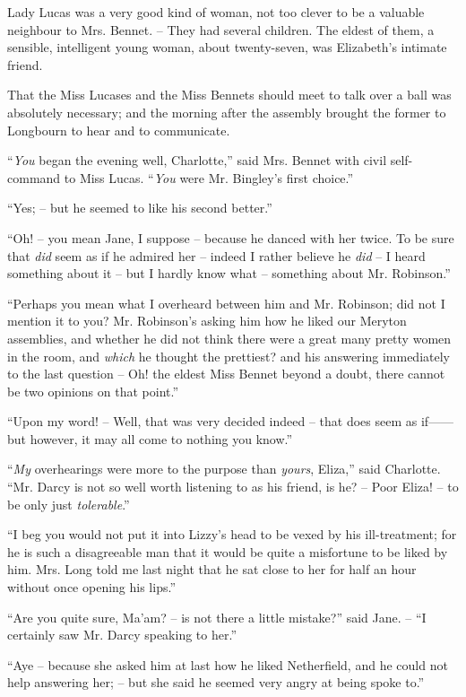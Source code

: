 Lady Lucas was a very good kind of woman, not too
clever to be a valuable neighbour to Mrs. Bennet. -- They
had several children. The eldest of them, a sensible,
intelligent young woman, about twenty-seven, was Elizabeth’s
intimate friend.

That the Miss Lucases and the Miss Bennets should
meet to talk over a ball was absolutely necessary; and
the morning after the assembly brought the former to
Longbourn to hear and to communicate.

“\textit{You} began the evening well, Charlotte,” said Mrs.
Bennet with civil self-command to Miss Lucas. “\textit{You}
were Mr. Bingley’s first choice.”

“Yes; -- but he seemed to like his second better.”

“Oh! -- you mean Jane, I suppose -- because he danced
with her twice. To be sure that \textit{did} seem as if he admired
her -- indeed I rather believe he \textit{did} -- I heard something
about it -- but I hardly know what -- something about
Mr. Robinson.”

“Perhaps you mean what I overheard between him
and Mr. Robinson; did not I mention it to you? Mr.
Robinson’s asking him how he liked our Meryton assemblies,
and whether he did not think there were a great
many pretty women in the room, and \textit{which} he thought
the prettiest? and his answering immediately to the last
question -- Oh! the eldest Miss Bennet beyond a doubt,
there cannot be two opinions on that point.”

“Upon my word! -- Well, that was very decided indeed -- that
does seem as if------but however, it may all come
to nothing you know.”

“\textit{My} overhearings were more to the purpose than \textit{yours},
Eliza,” said Charlotte. “Mr. Darcy is not so well worth
listening to as his friend, is he? -- Poor Eliza! -- to be only
just \textit{tolerable}.”

“I beg you would not put it into Lizzy’s head to
be vexed by his ill-treatment; for he is such a disagreeable
man that it would be quite a misfortune to be
liked by him. Mrs. Long told me last night that he
sat close to her for half an hour without once opening his
lips.”

“Are you quite sure, Ma’am? -- is not there a little
mistake?” said Jane. -- “I certainly saw Mr. Darcy
speaking to her.”

“Aye -- because she asked him at last how he liked
Netherfield, and he could not help answering her; -- but
she said he seemed very angry at being spoke to.”

